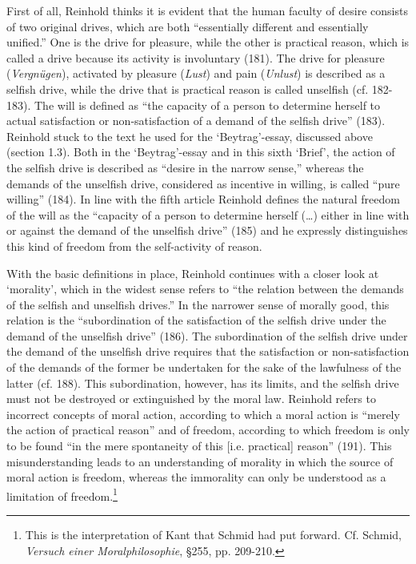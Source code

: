  First of all, Reinhold thinks it is evident that the human faculty of desire consists of two original drives, which are both ``essentially different and essentially unified.'' One is the drive for pleasure, while the other is practical reason, which is called a drive because its activity is involuntary (181). The drive for pleasure (\textit{Vergn\"{u}gen}), activated by pleasure (\textit{Lust}) and pain (\textit{Unlust}) is described as a selfish drive, while the drive that is practical reason is called unselfish (cf. 182{-}183). The will is defined as ``the capacity of a person to determine herself to actual satisfaction or non{-}satisfaction of a demand of the selfish drive'' (183). Reinhold stuck to the text he used for the `Beytrag'{-}essay, discussed above (section 1.3). Both in the `Beytrag'{-}essay and in this sixth `Brief', the action of the selfish drive is described as ``desire in the narrow sense,'' whereas the demands of the unselfish drive, considered as incentive in willing, is called ``pure willing'' (184). In line with the fifth article Reinhold defines the natural freedom of the will as the ``capacity of a person to determine herself (\ldots ) either in line with or against the demand of the unselfish drive'' (185) and he expressly distinguishes this kind of freedom from the self{-}activity of reason. 

 With the basic definitions in place, Reinhold continues with a closer look at `morality', which in the widest sense refers to ``the relation between the demands of the selfish and unselfish drives.'' In the narrower sense of morally good, this relation is the ``subordination of the satisfaction of the selfish drive under the demand of the unselfish drive'' (186). The subordination of the selfish drive under the demand of the unselfish drive requires that the satisfaction or non{-}satisfaction of the demands of the former be undertaken for the sake of the lawfulness of the latter (cf. 188). This subordination, however, has its limits, and the selfish drive must not be destroyed or extinguished by the moral law. Reinhold refers to incorrect concepts of moral action, according to which a moral action is ``merely the action of practical reason'' and of freedom, according to which freedom is only to be found ``in the mere spontaneity of this [i.e. practical] reason'' (191). This misunderstanding leads to an understanding of morality in which the source of moral action is freedom, whereas the immorality can only be understood as a limitation of freedom.\footnote{ This is the interpretation of Kant that Schmid had put forward. Cf. Schmid, \textit{Versuch einer Moralphilosophie}, \S  255, pp. 209{-}210. } 


